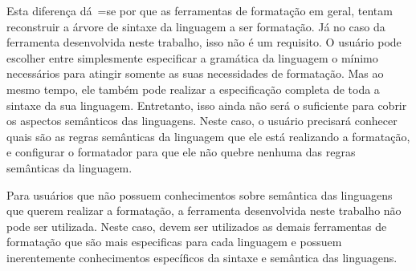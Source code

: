{    Esta diferença dá~=se por que as ferramentas de formatação em geral,
    tentam reconstruir a árvore de sintaxe da linguagem a ser formatação.
    Já no caso da ferramenta desenvolvida neste trabalho,
    isso não é um requisito.
    O usuário pode escolher entre simplesmente especificar a gramática da linguagem o mínimo necessários para atingir somente as suas necessidades de formatação.
    Mas ao mesmo tempo,
    ele também pode realizar a especificação completa de toda a sintaxe da sua linguagem.
    Entretanto,
    isso ainda não será o suficiente para cobrir os aspectos semânticos das linguagens.
    Neste caso,
    o usuário precisará conhecer quais são as regras semânticas da linguagem que ele está realizando a formatação,
    e configurar o formatador para que ele não quebre nenhuma das regras semânticas da linguagem.

    Para usuários que não possuem conhecimentos sobre semântica das linguagens que querem realizar a formatação,
    a ferramenta desenvolvida neste trabalho não pode ser utilizada.
    Neste caso,
    devem ser utilizados as demais ferramentas de formatação que são mais especificas para cada linguagem e
    possuem inerentemente conhecimentos específicos da sintaxe e
    semântica das linguagens.
}
